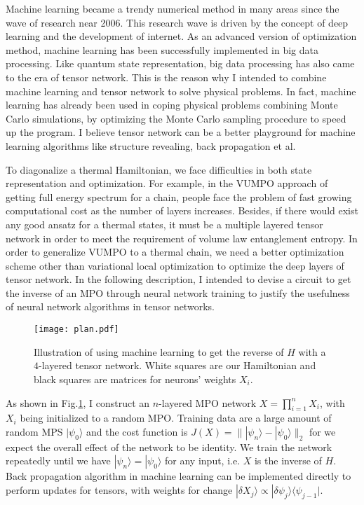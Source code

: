 \documentclass[a4paper]{article}
\newcommand{\<}{\langle}
\renewcommand{\>}{\rangle}
\begin{document}
Machine learning became a trendy numerical method in many areas since the wave of research near 2006.
This research wave is driven by the concept of deep learning and the development of internet.
As an advanced version of optimization method, machine learning has been successfully implemented in big data processing.
Like quantum state representation, big data processing has also came to the era of tensor network\cite{Cichocki2014}.
This is the reason why I intended to combine machine learning and tensor network to solve physical problems.
In fact, machine learning has already been used in coping physical problems combining Monte Carlo simulations, by optimizing the Monte Carlo sampling procedure to speed up the program.\cite{Liu2016}
I believe tensor network can be a better playground for machine learning algorithms like structure revealing, back propagation et al.

To diagonalize a thermal Hamiltonian, we face difficulties in both state representation and optimization.
For example, in the VUMPO approach of getting full energy spectrum for a chain,
people face the problem of fast growing computational cost as the number of layers increases. Besides, if there would exist any good ansatz for a thermal states, it must be a multiple layered tensor network in order to meet the requirement of volume law entanglement entropy.
In order to generalize VUMPO to a thermal chain, we need a better optimization scheme other than variational local optimization to optimize the deep layers of tensor network.
In the following description, I intended to devise a circuit to get the inverse of an MPO through neural network training to justify the usefulness of neural network algorithms in tensor networks.

\begin{figure}
    \begin{center}
    \texttt{[image: plan.pdf]}
    \end{center}
    \caption{Illustration of using machine learning to get the reverse of $H$ with a $4$-layered tensor network.
    White squares are our Hamiltonian and black squares are matrices for neurons' weights $X_i$.}\label{plan}
\end{figure}

As shown in Fig.\ref{plan}, I construct an $n$-layered MPO network $X=\prod\limits_{i=1}^n X_i$, with $X_i$ being initialized to a random MPO.
Training data are a large amount of random MPS $|\psi_0\>$ and the cost function is $J(X)=\||\psi_n\>-|\psi_0\>\|_2$ for we expect the overall effect of the network to be identity.
We train the network repeatedly until we have $|\psi_n\>=|\psi_0\>$ for any input, i.e. $X$ is the inverse of $H$.
Back propagation algorithm in machine learning can be implemented directly to perform updates for tensors,
with weights for change $|\delta X_j\>\propto |\delta \psi_j\>\<\psi_{j-1}|$.
\end{document}
